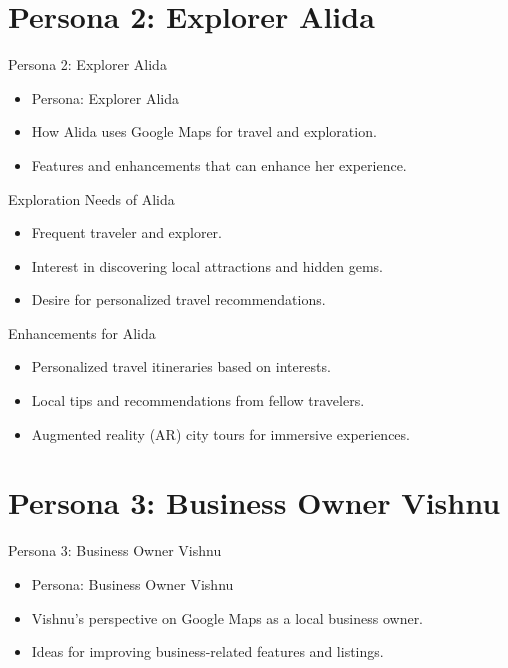 \documentclass[10pt, aspectratio=149]{beamer}
\begin{document}
\section{Persona 2: Explorer Alida}

\begin{frame}{Persona 2: Explorer Alida}
  \begin{itemize}
    \item Persona: Explorer Alida
    \item How Alida uses Google Maps for travel and exploration.
    \item Features and enhancements that can enhance her experience.
  \end{itemize}
\end{frame}

\begin{frame}{Exploration Needs of Alida}
  \begin{itemize}
    \item Frequent traveler and explorer.
    \item Interest in discovering local attractions and hidden gems.
    \item Desire for personalized travel recommendations.
  \end{itemize}
\end{frame}

\begin{frame}{Enhancements for Alida}
  \begin{itemize}
    \item Personalized travel itineraries based on interests.
    \item Local tips and recommendations from fellow travelers.
    \item Augmented reality (AR) city tours for immersive experiences.
  \end{itemize}
\end{frame}

\section{Persona 3: Business Owner Vishnu}

\begin{frame}{Persona 3: Business Owner Vishnu}
  \begin{itemize}
    \item Persona: Business Owner Vishnu
    \item Vishnu's perspective on Google Maps as a local business owner.
    \item Ideas for improving business-related features and listings.
  \end{itemize}
\end{frame}
\end{document}
